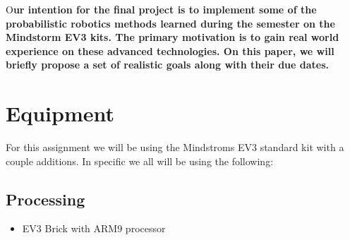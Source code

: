 \documentclass[DIV=calc, paper=a4, fontsize=11pt, onecolumn]{scrartcl}	 %
\title{\KBAIMethod} %
\author{ } %
\date{\today} %
\newcommand{\initial}[1]{ %
\lettrine[lines=3,lhang=0.3,nindent=0em]{
\color{DarkGoldenrod}
{\textsf{#1}}}{}}
\begin{document}


\maketitle %

\thispagestyle{fancy} %


\initial{O}\textbf{ur intention for the final project is to implement some of the probabilistic 
robotics methods learned during the semester on the Mindstorm EV3 kits. The primary motivation
is to gain real world experience on these advanced technologies. On this paper, we will briefly
propose a set of realistic goals along with their due dates.}


\section*{Equipment}
For this assignment we will be using the Mindstroms EV3 standard kit with a couple additions. In specific we
all will be using the following: \\

\subsection*{Processing}
\begin{itemize}
  \item EV3 Brick with ARM9 processor
\end{itemize}
\end{document}
